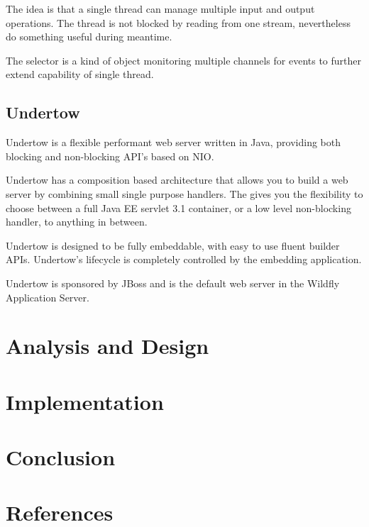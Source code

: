 \documentclass[11pt,draft,oneside]{fithesis2}
\begin{document}
The idea is that a single thread can manage multiple input and output operations. The thread is not blocked by reading from one stream, nevertheless do something useful during meantime.

The selector is a kind of object monitoring multiple channels for events to further extend capability of single thread.


\section{Undertow}

Undertow is a flexible performant web server written in Java, providing both blocking and non-blocking API’s based on NIO.

Undertow has a composition based architecture that allows you to build a web server by combining small single purpose handlers. The gives you the flexibility to choose between a full Java EE servlet 3.1 container, or a low level non-blocking handler, to anything in between.

Undertow is designed to be fully embeddable, with easy to use fluent builder APIs. Undertow’s lifecycle is completely controlled by the embedding application.

Undertow is sponsored by JBoss and is the default web server in the Wildfly Application Server.



\chapter{Analysis and Design}

\chapter{Implementation}

\chapter{Conclusion}

\printindex
\printglossary
\listoffigures
\listoftables

\begingroup
\def\tmpchapter{0}
\renewcommand{\chaptername}{}
\renewcommand{\thechapter}{}
\chapter{References}
\renewcommand{\chapter}[2]{}%




\endgroup

\appendix

\end{document}
